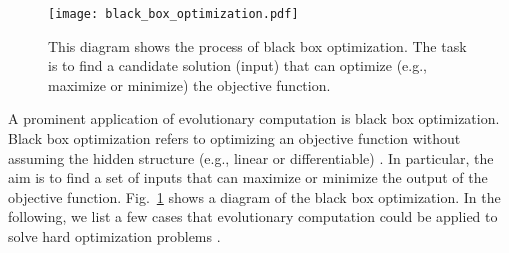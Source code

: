 \begin{figure}[!t]
  \centering
  \texttt{[image: black\_box\_optimization.pdf]}
  \caption{This diagram shows the process of black box optimization. The task is to find a candidate solution (input) that can optimize (e.g., maximize or minimize) the objective function.}
  \label{fig:black_box_optimization}
\end{figure}

A prominent application of evolutionary computation is black box optimization. Black box optimization refers to optimizing an objective function without assuming the hidden structure (e.g., linear or differentiable) \cite{BBOC2015}. In particular, the aim is to find a set of inputs that can maximize or minimize the output of the objective function. Fig.~\ref{fig:black_box_optimization} shows a diagram of the black box optimization. In the following, we list a few cases that evolutionary computation could be applied to solve hard optimization problems \cite{Melvin:PhD:2014}. 

